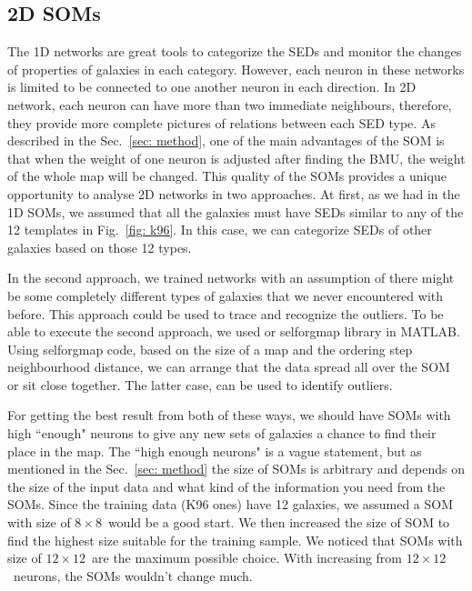     \subsection{2D SOMs}
    \label{sec: 2D}
    The 1D networks are great tools to categorize the SEDs and monitor the changes of properties of galaxies in each category.
    However, each neuron in these networks is limited to be connected to one another neuron in each direction.
    In 2D network, each neuron can have more than two immediate neighbours, therefore, they provide more complete pictures of relations between each SED type.
    As described in the Sec.~\ref{sec: method}, one of the main advantages of the SOM is that when the weight of one neuron is adjusted after finding the BMU, the weight of the whole map will be changed.
    This quality of the SOMs provides a unique opportunity to analyse 2D networks in two approaches. 
    At first, as we had in the 1D SOMs, we assumed that all the galaxies must have SEDs similar to any of the 12 templates in Fig.~\ref{fig: k96}.
    In this case, we can categorize SEDs of other galaxies based on those 12 types.
    
    In the second approach, we trained networks with an assumption of there might be some completely different types of galaxies that we never encountered with before.
    This approach could be used to trace and recognize the outliers.
    To be able to execute the second approach, we used or {\tiny selforgmap} library in {\tiny MATLAB}.
    Using {\tiny selforgmap} code, based on the size of a map and the ordering step neighbourhood distance, we can arrange that the data spread all over the SOM or sit close together.
    The latter case, can be used to identify outliers. 

    For getting the best result from both of these ways, we should have SOMs with high ``enough"  neurons to give any new sets of galaxies a chance to find their place in the map.
    The  ``high enough  neurons" is a vague statement, but as mentioned in the Sec.~\ref{sec: method} the size of SOMs is arbitrary and depends on the size of the input data and what kind of the information you need from the SOMs. %
    Since the training data (K96 ones) have 12 galaxies, we assumed a SOM with size of $8\times8$~would be a good start.
    We then increased the size of SOM to find the highest size suitable for the training sample.
    We noticed that SOMs with size of $12\times12$~are the maximum possible choice.
    With increasing from $12\times12$~neurons, the SOMs wouldn't change much.
    
